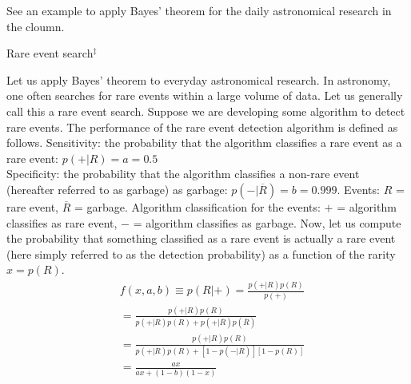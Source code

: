 See an example to apply Bayes' theorem for the daily astronomical research in the cloumn.

\begin{itembox}{Rare event search$^\ddagger$}
\footnotesize

Let us apply Bayes' theorem to everyday astronomical research. In astronomy, one often searches for rare events within a large volume of data. Let us generally call this a rare event search. Suppose we are developing some algorithm to detect rare events.
The performance of the rare event detection algorithm is defined as follows.
Sensitivity: the probability that the algorithm classifies a rare event as a rare event: $p(+|R) = a = 0.5$ \\
Specificity: the probability that the algorithm classifies a non-rare event (hereafter referred to as garbage) as garbage: $p(-|\overline{R}) = b = 0.999$. Events: $R$ = rare event, $\overline{R}$ = garbage. Algorithm classification for the events: $+$ = algorithm classifies as rare event, $-$ = algorithm classifies as garbage. Now, let us compute the probability that something classified as a rare event is actually a rare event (here simply referred to as the detection probability) as a function of the rarity $x=p(R)$.
\begin{align}
    &f(x,a,b) \equiv p(R|+) = \frac{p(+|R) p(R)}{ p(+)} \nonumber \\ 
    &= \frac{p(+|R) p(R)}{ p(+|R) p(R) + p(+|\overline{R}) p(\overline{R})} \nonumber \\
    &= \frac{p(+|R) p(R)}{ p(+|R) p(R) + [ 1- p(-|\overline{R}) ] [1- p(R)]} \nonumber \\
    &= \frac{a x }{a x + ( 1 - b ) (1 - x)} 
\end{align}


\end{itembox}
